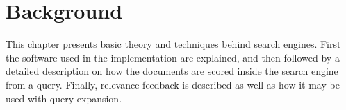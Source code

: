 \chapter{Background}
\label{ch:background}
This chapter presents basic theory and techniques behind search engines. First
the software used in the implementation are explained, and then followed by a
detailed description on how the documents are scored inside the search engine from a
query. Finally, relevance feedback is described as well as how it may be used with query
expansion.









